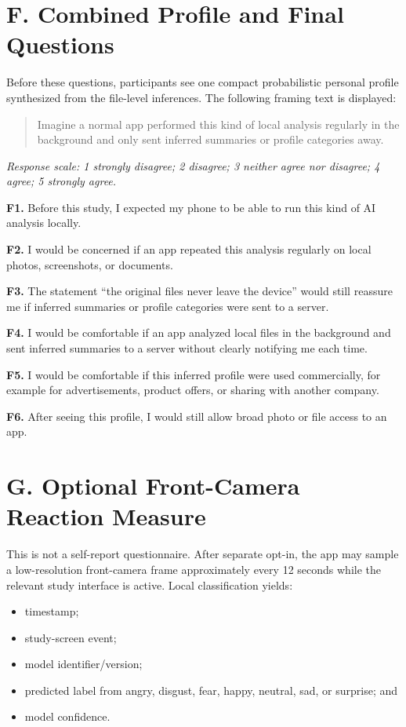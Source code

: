 \documentclass[10pt,a4paper]{article}
\newcommand{\scale}[1]{\textit{Response scale: #1}}
\newcommand{\qitem}[2]{\textbf{#1} #2\par}
\begin{document}
\newpage
\section*{F. Combined Profile and Final Questions}

Before these questions, participants see one compact probabilistic personal profile synthesized from the file-level inferences. The following framing text is displayed:

\begin{quote}
Imagine a normal app performed this kind of local analysis regularly in the background and only sent inferred summaries or profile categories away.
\end{quote}

\scale{1 strongly disagree; 2 disagree; 3 neither agree nor disagree; 4 agree; 5 strongly agree.}

\qitem{F1.}{Before this study, I expected my phone to be able to run this kind of AI analysis locally.}
\qitem{F2.}{I would be concerned if an app repeated this analysis regularly on local photos, screenshots, or documents.}
\qitem{F3.}{The statement ``the original files never leave the device'' would still reassure me if inferred summaries or profile categories were sent to a server.}
\qitem{F4.}{I would be comfortable if an app analyzed local files in the background and sent inferred summaries to a server without clearly notifying me each time.}
\qitem{F5.}{I would be comfortable if this inferred profile were used commercially, for example for advertisements, product offers, or sharing with another company.}
\qitem{F6.}{After seeing this profile, I would still allow broad photo or file access to an app.}

\section*{G. Optional Front-Camera Reaction Measure}

This is not a self-report questionnaire. After separate opt-in, the app may sample a low-resolution front-camera frame approximately every 12 seconds while the relevant study interface is active. Local classification yields:
\begin{itemize}
  \item timestamp;
  \item study-screen event;
  \item model identifier/version;
  \item predicted label from angry, disgust, fear, happy, neutral, sad, or surprise; and
  \item model confidence.
\end{itemize}
\end{document}
